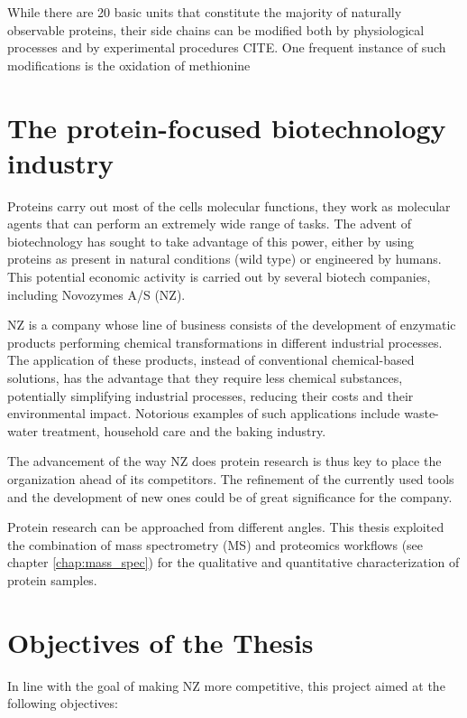 \documentclass[11pt, a4paper]{report}
\begin{document}
While there are 20 basic units that constitute the majority of naturally observable proteins, their side chains can be modified both by physiological processes and by experimental procedures CITE. One frequent instance of such modifications is the oxidation of methionine


\section{The protein-focused biotechnology industry}


Proteins carry out most of the cell\textquotesingle s molecular functions, they work as molecular agents that can perform an extremely wide range of tasks. The advent of biotechnology has sought to take advantage of this power, either by using proteins as present in natural conditions (wild type) or engineered by humans. This potential economic activity is carried out by several biotech companies, including Novozymes A/S (NZ).

\ac{NZ} is a company whose line of business consists of the development of enzymatic products performing chemical transformations in different industrial processes. The application of these products, instead of conventional chemical-based solutions, has the advantage that they require less chemical substances, potentially simplifying industrial processes, reducing their costs and their environmental impact. Notorious examples of such applications include waste-water treatment, household care and the baking industry.


The advancement of the way \ac{NZ} does protein research is thus key to place the organization ahead of its competitors. The refinement of the currently used tools and the development of new ones could be of great significance for the company. 

Protein research can be approached from different angles. This thesis exploited the combination of mass spectrometry (\ac{MS}) and proteomics workflows (see chapter \ref{chap:mass_spec}) for the qualitative and quantitative characterization of protein samples.



\section{Objectives of the Thesis}
\label{sec:objectives}

In line with the goal of making \ac{NZ} more competitive, this project aimed at the following objectives:
\end{document}

